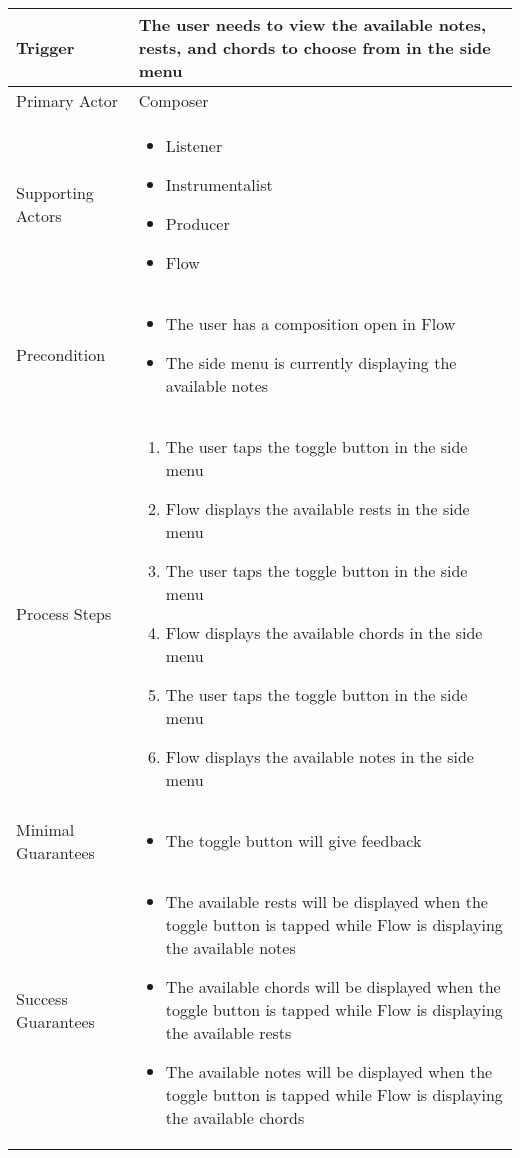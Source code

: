 \begin{longtable}{|X|X|}
\hline
Trigger & 
The user needs to view the available notes, rests, and chords to choose from in the side menu \\
\hline
Primary Actor & 
Composer \\
\hline
Supporting Actors & 
\begin{itemize}
\item Listener
\item Instrumentalist
\item Producer
\item Flow
\end{itemize} \\
\hline
Precondition & 
\begin{itemize}
\item The user has a composition open in Flow
\item The side menu is currently displaying the available notes
\end{itemize} \\
\hline
Process Steps & 
\begin{enumerate}
\item The user taps the toggle button in the side menu
\item Flow displays the available rests in the side menu
\item The user taps the toggle button in the side menu
\item Flow displays the available chords in the side menu
\item The user taps the toggle button in the side menu
\item Flow displays the available notes in the side menu
\end{enumerate} \\
\hline
Minimal Guarantees &
\begin{itemize}
  \item The toggle button will give feedback
\end{itemize} \\
\hline
Success Guarantees & 
\begin{itemize}
  \item The available rests will be displayed when the toggle button is tapped while Flow is displaying the available notes
  \item The available chords will be displayed when the toggle button is tapped while Flow is displaying the available rests
  \item The available notes will be displayed when the toggle button is tapped while Flow is displaying the available chords
\end{itemize} \\
\hline
\end{longtable}
